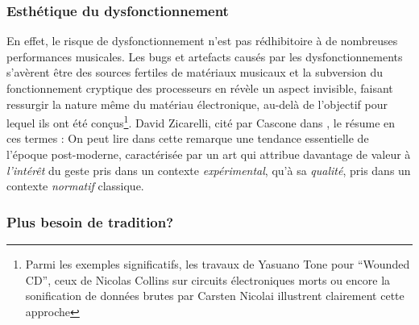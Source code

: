 	
\subsubsection{Esthétique du dysfonctionnement}

\noindent En effet, le risque de dysfonctionnement n'est pas rédhibitoire à de nombreuses performances musicales. Les bugs et artefacts causés par les dysfonctionnements s'avèrent être des sources fertiles de matériaux musicaux et la subversion du fonctionnement cryptique des processeurs en révèle un aspect invisible, faisant ressurgir la nature même du matériau électronique, au-delà de l'objectif pour lequel ils ont été conçus\footnote{Parmi les exemples significatifs, les travaux de Yasuano Tone pour ``Wounded CD'', ceux de Nicolas Collins sur circuits électroniques morts ou encore la sonification de données brutes par Carsten Nicolai illustrent clairement cette approche}. David Zicarelli, cité par Cascone dans \cite{cascone_aesthetics_2000}, le résume en ces termes : 
On peut lire dans cette remarque une tendance essentielle de l'époque post-moderne, caractérisée par un art qui attribue davantage de valeur à \textit{l'intérêt} du geste pris dans un contexte \textit{expérimental}, qu'à sa \textit{qualité}, pris dans un contexte \textit{normatif} classique.

\subsubsection{Plus besoin de tradition?}

